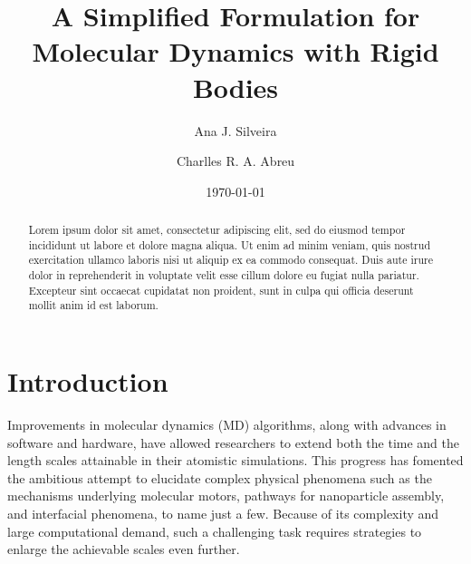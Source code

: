 \documentclass[aip,jcp,reprint,amsmath,amssymb]{revtex4-1}
\begin{document}
\title{A Simplified Formulation for Molecular Dynamics with Rigid Bodies}

\author{Ana J. Silveira}

\author{Charlles R. A. Abreu}

\date{\today}

\begin{abstract}
Lorem ipsum dolor sit amet, consectetur adipiscing elit, sed do eiusmod tempor incididunt ut labore et dolore magna aliqua. Ut enim ad minim veniam, quis nostrud exercitation ullamco laboris nisi ut aliquip ex ea commodo consequat. Duis aute irure dolor in reprehenderit in voluptate velit esse cillum dolore eu fugiat nulla pariatur. Excepteur sint occaecat cupidatat non proident, sunt in culpa qui officia deserunt mollit anim id est laborum.
\end{abstract}

\maketitle

\section{Introduction}

Improvements in molecular dynamics (MD) algorithms, along with advances in software and hardware, have allowed researchers to extend both the time and the length scales attainable in their atomistic simulations. This progress has fomented the ambitious attempt to elucidate complex physical phenomena such as the mechanisms underlying molecular motors, pathways for nanoparticle assembly, and interfacial phenomena, to name just a few. Because of its complexity and large computational demand, such a challenging task requires strategies to enlarge the achievable scales even further.
\end{document}
